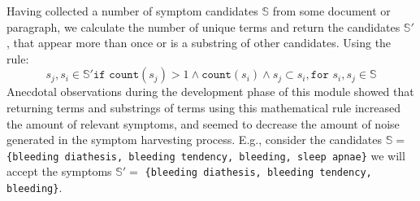 \documentclass[10pt,letterpaper,final]{article}
\begin{document}
Having collected a number of symptom candidates $\mathbb{S}$ from some
document or paragraph, we calculate the number of unique terms and return
the candidates $\mathbb{S'}$, that appear more than once or is a
substring of other candidates. Using the rule:
\begin{equation}
 s_{j}, s_{i} \in \mathbb{S'}\texttt{if count}(s_{j}) > 1 \wedge\texttt{count}(s_{i}) \wedge s_{j} \subset s_{i}, \texttt{for } s_{i}, s_{j} \in \mathbb{S}
\end{equation}
Anecdotal observations during the development phase of this module
showed that returning terms and substrings of terms using this
mathematical rule increased the amount of relevant symptoms, and seemed
to decrease the amount of noise generated in the symptom harvesting
process. E.g., consider the candidates $\mathbb{S} = $
\texttt{\{bleeding diathesis, bleeding tendency, bleeding, sleep
apnae\}} we will accept the symptoms $\mathbb{S'} = $ \texttt{\{bleeding
diathesis, bleeding tendency, bleeding\}}.





\end{document}
